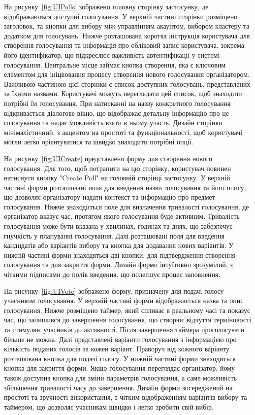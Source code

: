 \documentclass[14pt]{extreport}
\begin{document}
  На рисунку~\ref{fig:UIPolls} зображено головну сторінку застосунку, де відображаються доступні голосування. У верхній частині сторінки розміщено заголовок, та кнопки для вибору між управлінням акаунтом, вибором кластеру та додатком для голосувань. Нижче розташована коротка інструкція користувача для створення голосування та інформація про обліковий запис користувача, зокрема його ідентифікатор, що підкреслює важливість автентифікації у системі голосування. Центральне місце займає кнопка створення, яка є ключовим елементом для ініціювання процесу створення нового голосування організатором. Важливою частиною цієї сторінки є список доступних голосувань, представлених за їхніми назвами. Користувачі можуть переглядати цей список, щоб знаходити потрібні їм голосування. При натисканні на назву конкретного голосування відкривається діалогове вікно, що відображає детальну інформацію про це голосування та надає можливість взяти в ньому участь. Дизайн сторінки мінімалістичний, з акцентом на простоті та функціональності, щоб користувачі могли легко орієнтуватися та швидко знаходити потрібні опції.

  На рисунку~\ref{fig:UICreate} представлено форму для створення нового голосування. Для того, щоб потрапити на цю сторінку, користувач повинен натиснути кнопку "Create Poll" на головній сторінці застосунку. У верхній частині форми розташовані поля для введення назви голосування та його опису, що дозволяє організатору надати контекст та інформацію про предмет голосування. Нижче знаходиться поле для визначення тривалості голосування, де організатор вказує час, протягом якого голосування буде активним. Тривалість голосування може бути вказана у хвилинах, годинах та днях, що забезпечує гнучкість у плануванні голосування. Далі розташовані поля для введення кандидатів або варіантів вибору та кнопка для додавання нових варіантів. У нижній частині форми знаходяться дві кнопки: для підтвердження створення голосування та для закриття форми. Дизайн форми інтуїтивно зрозумілий, з чіткими підписами до полів введення, що полегшує процес заповнення.

  На рисунку~\ref{fig:UIVote} зображено форму, призначену для подачі голосу учасником голосування. У верхній частині форми відображається назва та опис голосування. Нижче розміщено таймер, який спливає в реальному часі та показує час, що залишився до завершення голосування, що створює відчуття терміновості та стимулює учасників до активності. Після завершення таймера проголосувати більше не можна. Далі представлені варіанти голосування з інформацією про кількість поданих голосів за кожен варіант. Праворуч від кожного варіанту розташована кнопка для подачі голосу. У нижній частині форми знаходиться кнопка для закриття форми. Якщо голосування переглядає організатор, йому також доступна кнопка для зміни параметрів голосування, а саме можливість збільшення тривалості часу до завершення. Дизайн форми зосереджений на простоті та зручності використання, з чітким відображенням варіантів вибору та таймером, що дозволяє учасникам швидко і легко зробити свій вибір.
\end{document}
